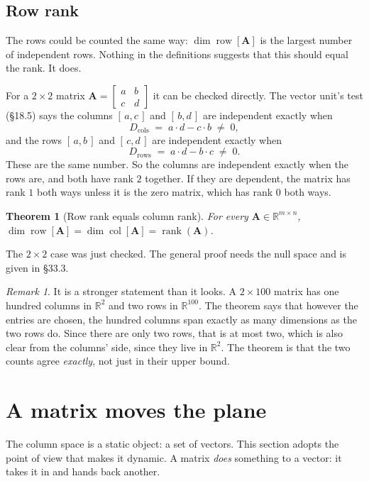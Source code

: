 \documentclass[11pt]{article}
\theoremstyle{plain}
\newtheorem{thm}{Theorem}[section]
\theoremstyle{definition}
\theoremstyle{remark}
\newtheorem*{rmk}{Remark}
\newcommand{\R}{\mathbb{R}}
\newcommand{\mt}[1]{\mathbf{#1}}        %
\newcommand{\colsp}[1]{\operatorname{col}[#1]}
\newcommand{\rowsp}[1]{\operatorname{row}[#1]}
\DeclareMathOperator{\rank}{rank}
\begin{document}
\subsection{Row rank}
The rows could be counted the same way: $\dim\rowsp{\mt{A}}$ is the largest
number of independent rows. Nothing in the definitions suggests that this
should equal the rank. It does.

For a $2\times2$ matrix
$\mt{A}=\begin{bmatrix}a&b\\c&d\end{bmatrix}$ it can be checked directly. The
vector unit's test (\S18.5) says the columns $[\,a,c\,]$ and $[\,b,d\,]$ are
independent exactly when
\[
  D_{\text{cols}} \;=\; a\cdot d - c\cdot b \;\neq\; 0 ,
\]
and the rows $[\,a,b\,]$ and $[\,c,d\,]$ are independent exactly when
\[
  D_{\text{rows}} \;=\; a\cdot d - b\cdot c \;\neq\; 0 .
\]
These are the same number. So the columns are independent exactly when the
rows are, and both have rank $2$ together. If they are dependent, the matrix
has rank $1$ both ways unless it is the zero matrix, which has rank $0$ both
ways.

\begin{thm}[Row rank equals column rank]
For every $\mt{A}\in\R^{m\times n}$,
$\dim\rowsp{\mt{A}} = \dim\colsp{\mt{A}} = \rank(\mt{A})$.
\end{thm}

\noindent The $2\times2$ case was just checked. The general proof needs
the null space and is given in \S33.3.

\begin{rmk}
It is a stronger statement than it looks. A $2\times100$ matrix has one hundred
columns in $\R^{2}$ and two rows in $\R^{100}$. The theorem says that however
the entries are chosen, the hundred columns span exactly as many dimensions as
the two rows do. Since there are only two rows, that is at most two, which is
also clear from the columns' side, since they live in $\R^{2}$. The theorem is
that the two counts agree \emph{exactly}, not just in their upper bound.
\end{rmk}

\section{A matrix moves the plane}
The column space is a static object: a set of vectors. This section adopts the
point of view that makes it dynamic. A matrix \emph{does} something to a
vector: it takes it in and hands back another.
\end{document}

